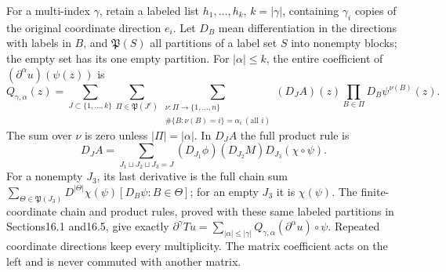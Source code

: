 \documentclass[
  11pt,
]{article}
\begin{document}
For a multi-index \(\gamma\), retain a labeled list \(h_1,\ldots,h_k\),
\(k=|\gamma|\), containing \(\gamma_i\) copies of the original
coordinate direction \(e_i\). Let \(D_B\) mean differentiation in the
directions with labels in \(B\), and \(\mathfrak P(S)\) all partitions
of a label set \(S\) into nonempty blocks; the empty set has its one
empty partition. For \(|\alpha|\le k\), the entire coefficient of
\((\partial^\alpha u)(\psi(z))\) is \[
 Q_{\gamma,\alpha}(z)=
 \sum_{J\subset\{1,\ldots,k\}}
 \sum_{\Pi\in\mathfrak P(J^c)}
 \sum_{\substack{\nu:\Pi\to\{1,\ldots,n\}\\
       \#\{B:\nu(B)=i\}=\alpha_i\ (\text{all }i)}}
       (D_J A)(z)\prod_{B\in\Pi}D_B\psi^{\nu(B)}(z).
 \tag{GB4}
\] The sum over \(\nu\) is zero unless \(|\Pi|=|\alpha|\). In \(D_J A\)
the full product rule is \[
 D_J A=\sum_{J_1\sqcup J_2\sqcup J_3=J}
        (D_{J_1}\phi)(D_{J_2}M)D_{J_3}(\chi\circ\psi).
 \tag{GB5}
\] For a nonempty \(J_3\), its last derivative is the full chain sum
\(\sum_{\Theta\in\mathfrak P(J_3)}
D^{|\Theta|}\chi(\psi)[D_B\psi:B\in\Theta]\); for an empty \(J_3\) it is
\(\chi(\psi)\). The finite-coordinate chain and product rules, proved
with these same labeled partitions in Sections16.1 and16.5, give exactly
\(\partial^\gamma Tu=\sum_{|\alpha|\le|\gamma|}
Q_{\gamma,\alpha}(\partial^\alpha u)\circ\psi\). Repeated coordinate
directions keep every multiplicity. The matrix coefficient acts on the
left and is never commuted with another matrix.
\end{document}
